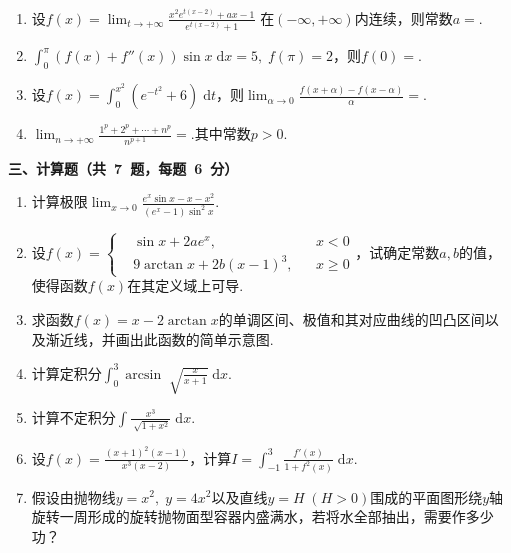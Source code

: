 \documentclass[11pt,a4paper]{ctexart}
\def\d{\,\mathrm{d}}
\def\d{\;\mathrm{d}}
\newcommand{\addpage}{
	\newpage
	 \begin{center}
    	\begin{Large}
    		\begin{center}
    			\textbf{仲英学业辅导中心 2021~-~2022 学年第一学期 期中考试模拟试题}
    			
    			{\zihao{5}  ~~仲英学业辅导中心~·~监制\hfill《线性代数与解析几何》期中模拟试题\hfill 第\;\thepage\;页~~ ~共 \pageref{LastPage}~页\hfill~~~
		  
		............................................装........................................订.......................................线............................................... \\[1mm]
	}


    		\end{center}
    	\end{Large}
    \end{center}\vspace{-5mm}}
\begin{document}
\begin{framed}
\begin{enumerate}
		\item 设\(f(x) = \displaystyle \lim _{t \to+\infty} \frac{x^2e^{t(x - 2) }+ ax - 1}{e^{t(x - 2)} + 1}\)	在\((-\infty, +\infty)\)内连续，则常数\(a = \)\tk{}.
		
		\item \(\displaystyle \int_0^\pi (f(x) + f''(x)) \sin x \d x = 5,\; f(\pi) = 2\)，则\(f(0) = \)\tk{}.
		
		\item 设\(f(x) = \displaystyle \int_0^{x^2} (e^{-t^2} + 6)\d t\)，则\(\displaystyle \lim_{\alpha \to 0}\frac{f(x + \alpha) - f(x - \alpha)}{\alpha} = \)\tk{}.

		\item \(\displaystyle \lim_{n \to +\infty} \frac{1^p + 2^p + \cdots + n^p}{n^{p + 1}} = \)\tk{}.其中常数\(p > 0\).
 
	\end{enumerate}    

	\begin{large}
		\noindent\textbf{三、计算题（共~7~题，每题~6~分）}
	 \end{large}

	 \begin{enumerate}
		\item 计算极限\(\displaystyle \lim_{x \to 0} \frac{e^x\sin x - x - x^2}{(e^x - 1) \sin ^2x}\).\[\] \[\]\[\]\[\]\[\]\[\]\[\]\[\]\[\]\[\]
		\item 设\(f(x) = \left\{\begin{aligned}
			&\sin x + 2ae^x, & & x < 0\\
			&9\arctan x + 2b(x - 1)^3,& & x \geq 0
		\end{aligned}\right.\)，试确定常数\(a, b\)的值，使得函数\(f(x)\)在其定义域上可导.\[\] \[\]\[\]\[\]\[\]\[\]\[\]\[\]\[\]\[\]
		\item 求函数\(f(x ) = x - 2 \arctan x	\)的单调区间、极值和其对应曲线的凹凸区间以及渐近线，并画出此函数的简单示意图.\[\] \[\]\[\]\[\]\[\]\[\]\[\]\[\]\[\]\[\]
		\item 计算定积分\(\displaystyle \int_0^3 \arcsin \sqrt[]{\frac{x}{x + 1}}\d x\).\[\] \[\]\[\]\[\]\[\]\[\]\[\]\[\]\[\]\[\]
		\item 计算不定积分\(\displaystyle \int \frac{x^3}{\sqrt[]{1 + x^2}}\d x.\)\[\] \[\]\[\]\[\]\[\]\[\]\[\]\[\]\[\]\[\]
		\item 设\(\displaystyle f(x) = \frac{(x+1)^2 (x - 1)}{x^3 (x - 2)}\)，计算\(\displaystyle I = \int_{-1}^3 \frac{f'(x)}{1 + f^2 (x) } \d x.\) \[\] \[\]\[\]\[\]\[\]\[\]\[\]\[\]\[\]\[\]
		\item 假设由抛物线\(y = x^2,\; y = 4x^2\)以及直线\(y = H\;(H > 0)\)围成的平面图形绕\(y\)轴旋转一周形成的旋转抛物面型容器内盛满水，若将水全部抽出，需要作多少功？\[\] \[\]\[\]\[\]\[\]\[\]\[\]\[\]\[\]\[\]
	 \end{enumerate}



\end{framed}
\end{document}
